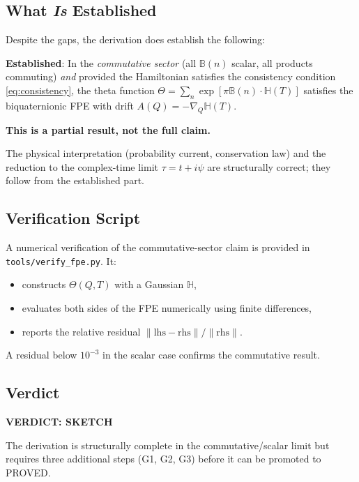 \documentclass[12pt]{article}
\theoremstyle{definition}
\theoremstyle{remark}
\begin{document}
\subsection{What \emph{Is} Established}

Despite the gaps, the derivation does establish the following:

\begin{resultbox}
\textbf{Established}: In the \emph{commutative sector} (all $\mathbb{B}(n)$ scalar, all products
commuting) \emph{and} provided the Hamiltonian satisfies the consistency condition
\eqref{eq:consistency}, the theta function $\Theta = \sum_n \exp[\pi\mathbb{B}(n)\cdot\mathbb{H}(T)]$
satisfies the biquaternionic FPE with drift $A(Q) = -\nabla_Q\mathbb{H}(T)$.

\textbf{This is a partial result, not the full claim.}
\end{resultbox}

The physical interpretation (probability current, conservation law) and the reduction
to the complex-time limit $\tau = t+i\psi$ are structurally correct; they follow from
the established part.

\subsection{Verification Script}

A numerical verification of the commutative-sector claim is provided in
\texttt{tools/verify\_fpe.py}.  It:
\begin{itemize}
  \item constructs $\Theta(Q,T)$ with a Gaussian $\mathbb{H}$,
  \item evaluates both sides of the FPE numerically using finite differences,
  \item reports the relative residual $\|\text{lhs} - \text{rhs}\|/\|\text{rhs}\|$.
\end{itemize}

A residual below $10^{-3}$ in the scalar case confirms the commutative result.

\subsection{Verdict}

\begin{center}
\large\textbf{VERDICT: SKETCH}
\end{center}

The derivation is structurally complete in the commutative/scalar limit but requires
three additional steps (G1, G2, G3) before it can be promoted to PROVED.
\end{document}
